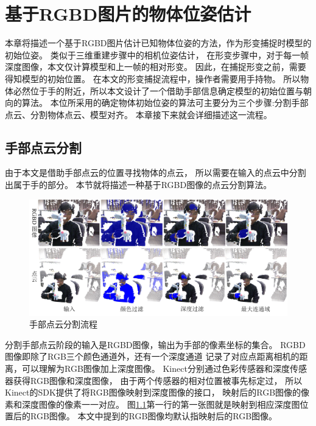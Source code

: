 \chapter{基于RGBD图片的物体位姿估计}


 本章将描述一个基于RGBD图片估计已知物体位姿的方法，作为形变捕捉时模型的初始位姿。
 类似于三维重建步骤中的相机位姿估计，
 在形变步骤中，对于每一帧深度图像，本文仅计算模型和上一帧的相对形变。
 因此，在捕捉形变之前，需要得知模型的初始位置。
 在本文的形变捕捉流程中，操作者需要用手持物。
 所以物体必然位于手的附近，所以本文设计了一个借助手部信息确定模型的初始位置与朝向的算法。
 本位所采用的确定物体初始位姿的算法可主要分为三个步骤:分割手部点云、分割物体点云、模型对齐。
 本章接下来就会详细描述这一流程。

\section{手部点云分割}
由于本文是借助手部点云的位置寻找物体的点云，
所以需要在输入的点云中分割出属于手的部分。
本节就将描述一种基于RGBD图像的点云分割算法。
\begin{figure}[h]
    \centering
    \includegraphics[width = \textwidth]{./Pictures/FindingHand.png}
    \caption{手部点云分割流程}
    \label{finding_hand}
\end{figure}
分割手部点云阶段的输入是RGBD图像，输出为手部的像素坐标的集合。
RGBD图像即除了RGB三个颜色通道外，还有一个深度通道
记录了对应点距离相机的距离，可以理解为RGB图像加上深度图像。
Kinect分别通过色彩传感器和深度传感器获得RGB图像和深度图像，
由于两个传感器的相对位置被事先标定过，
所以Kinect的SDK提供了将RGB图像映射到深度图像的接口，
映射后的RGB图像的像素和深度图像的像素一一对应。
图\ref{finding_hand}第一行的第一张图就是映射到相应深度图位置后的RGB图像。
本文中提到的RGB图像均默认指映射后的RGB图像。

